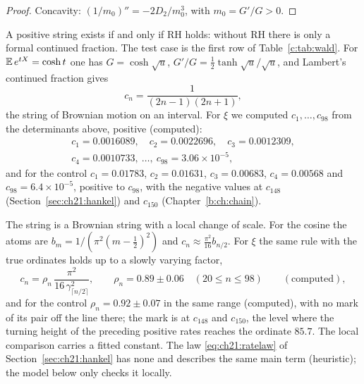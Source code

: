\begin{proof}
Concavity: $(1/m_0)''=-2D_2/m_0^3$, with $m_0=G'/G>0$.
\end{proof}

A positive string exists if and only if RH holds: without RH there is only a formal continued fraction. The test case is the first row of Table~\ref{c:tab:wald}. For $\mathbb{E}\,e^{tX}=\cosh t$ one has $G=\cosh\sqrt u$, $G'/G=\frac12\tanh\sqrt u/\sqrt u$, and Lambert's continued fraction gives
\[
c_n=\frac1{(2n-1)(2n+1)},
\]
the string of Brownian motion on an interval. For $\xi$ we computed $c_1,\dots,c_{98}$ from the determinants above, positive (computed):
\begin{gather*}
c_1=0.0016089,\quad c_2=0.0022696,\quad c_3=0.0012309,\\
c_4=0.0010733,\ \dots,\ c_{98}=3.06\times10^{-5},
\end{gather*}
and for the control $c_1=0.01783$, $c_2=0.01631$, $c_3=0.00683$, $c_4=0.00568$ and $c_{98}=6.4\times10^{-5}$, positive to $c_{98}$, with the negative values at $c_{148}$ (Section~\ref{sec:ch21:hankel}) and $c_{150}$ (Chapter~\ref{b:ch:chain}).

The string is a Brownian string with a local change of scale. For the cosine the atoms are $b_m=1/(\pi^2(m-\frac12)^2)$ and $c_n\approx\frac{\pi^2}{16}b_{n/2}$. For $\xi$ the same rule with the true ordinates holds up to a slowly varying factor,
\[
c_n=\rho_n\,\frac{\pi^2}{16\,\gamma_{\lceil n/2\rceil}^2},\qquad\rho_n=0.89\pm0.06\quad(20\le n\le98)\qquad(\text{computed}),
\]
and for the control $\rho_n=0.92\pm0.07$ in the same range (computed), with no mark of its pair off the line there; the mark is at $c_{148}$ and $c_{150}$, the level where the turning height of the preceding positive rates reaches the ordinate $85.7$. The local comparison carries a fitted constant. The law \eqref{eq:ch21:ratelaw} of Section~\ref{sec:ch21:hankel} has none and describes the same main term (heuristic); the model below only checks it locally.

